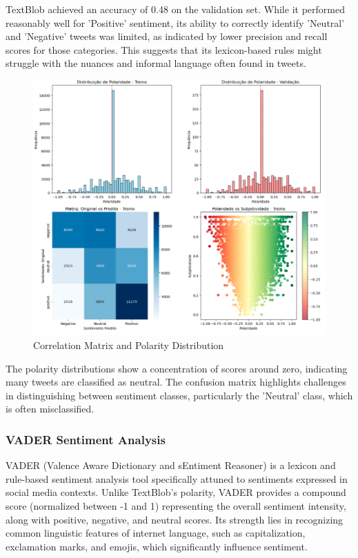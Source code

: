 TextBlob achieved an accuracy of 0.48 on the validation set. While it performed reasonably well for 'Positive' sentiment, its ability to correctly identify 'Neutral' and 'Negative' tweets was limited, as indicated by lower precision and recall scores for those categories. This suggests that its lexicon-based rules might struggle with the nuances and informal language often found in tweets.

\begin{figure}[H]
    \centering
    \includegraphics[width=1\linewidth]{images/text-blob.png}
    \caption{Correlation Matrix and Polarity Distribution}
    \label{fig:enter-label}
\end{figure}

The polarity distributions show a concentration of scores around zero, indicating many tweets are classified as neutral. The confusion matrix highlights challenges in distinguishing between sentiment classes, particularly the 'Neutral' class, which is often misclassified.


\subsubsection{ \textbf{VADER Sentiment Analysis}}
VADER (Valence Aware Dictionary and sEntiment Reasoner) is a lexicon and rule-based sentiment analysis tool specifically attuned to sentiments expressed in social media contexts. Unlike TextBlob's polarity, VADER provides a compound score (normalized between -1 and 1) representing the overall sentiment intensity, along with positive, negative, and neutral scores. Its strength lies in recognizing common linguistic features of internet language, such as capitalization, exclamation marks, and emojis, which significantly influence sentiment.

